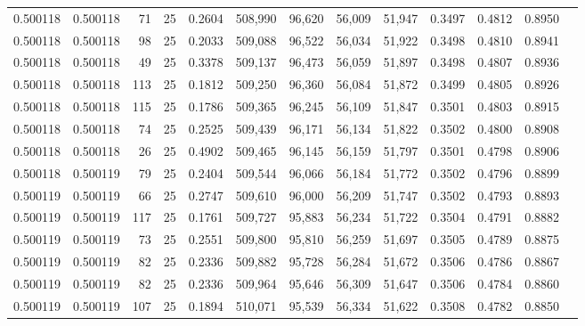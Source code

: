 \begin{tabular}{rrrrrrrrrrrrr}
0.500118 & 0.500118 &    71 &  25 &                                     0.2604 & 508,990 &  96,620 &  56,009 &  51,947 & 0.3497 & 0.4812 & 0.8950 \\
0.500118 & 0.500118 &    98 &  25 &                                     0.2033 & 509,088 &  96,522 &  56,034 &  51,922 & 0.3498 & 0.4810 & 0.8941 \\
0.500118 & 0.500118 &    49 &  25 &                                     0.3378 & 509,137 &  96,473 &  56,059 &  51,897 & 0.3498 & 0.4807 & 0.8936 \\
0.500118 & 0.500118 &   113 &  25 &                                     0.1812 & 509,250 &  96,360 &  56,084 &  51,872 & 0.3499 & 0.4805 & 0.8926 \\
0.500118 & 0.500118 &   115 &  25 &                                     0.1786 & 509,365 &  96,245 &  56,109 &  51,847 & 0.3501 & 0.4803 & 0.8915 \\
0.500118 & 0.500118 &    74 &  25 &                                     0.2525 & 509,439 &  96,171 &  56,134 &  51,822 & 0.3502 & 0.4800 & 0.8908 \\
0.500118 & 0.500118 &    26 &  25 &                                     0.4902 & 509,465 &  96,145 &  56,159 &  51,797 & 0.3501 & 0.4798 & 0.8906 \\
0.500118 & 0.500119 &    79 &  25 &                                     0.2404 & 509,544 &  96,066 &  56,184 &  51,772 & 0.3502 & 0.4796 & 0.8899 \\
0.500119 & 0.500119 &    66 &  25 &                                     0.2747 & 509,610 &  96,000 &  56,209 &  51,747 & 0.3502 & 0.4793 & 0.8893 \\
0.500119 & 0.500119 &   117 &  25 &                                     0.1761 & 509,727 &  95,883 &  56,234 &  51,722 & 0.3504 & 0.4791 & 0.8882 \\
0.500119 & 0.500119 &    73 &  25 &                                     0.2551 & 509,800 &  95,810 &  56,259 &  51,697 & 0.3505 & 0.4789 & 0.8875 \\
0.500119 & 0.500119 &    82 &  25 &                                     0.2336 & 509,882 &  95,728 &  56,284 &  51,672 & 0.3506 & 0.4786 & 0.8867 \\
0.500119 & 0.500119 &    82 &  25 &                                     0.2336 & 509,964 &  95,646 &  56,309 &  51,647 & 0.3506 & 0.4784 & 0.8860 \\
0.500119 & 0.500119 &   107 &  25 &                                     0.1894 & 510,071 &  95,539 &  56,334 &  51,622 & 0.3508 & 0.4782 & 0.8850 \\

\end{tabular}
